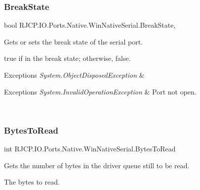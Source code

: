 \subsubsection{\texorpdfstring{BreakState}{BreakState}}
{\footnotesize\ttfamily bool R\+J\+C\+P.\+I\+O.\+Ports.\+Native.\+Win\+Native\+Serial.\+Break\+State\hspace{0.3cm}{\ttfamily [get]}, {\ttfamily [set]}}



Gets or sets the break state of the serial port. 

{\ttfamily true} if in the break state; otherwise, {\ttfamily false}. 


\begin{DoxyExceptions}{Exceptions}
{\em System.\+Object\+Disposed\+Exception} & 
\begin{DoxyExceptions}{Exceptions}
{\em System.\+Invalid\+Operation\+Exception} & Port not open.\\
\hline
\end{DoxyExceptions}
\\
\hline
\end{DoxyExceptions}
\mbox{\label{class_r_j_c_p_1_1_i_o_1_1_ports_1_1_native_1_1_win_native_serial_ab4ff2e42c520b5d86773f996bf1af716}} 
\subsubsection{\texorpdfstring{BytesToRead}{BytesToRead}}
{\footnotesize\ttfamily int R\+J\+C\+P.\+I\+O.\+Ports.\+Native.\+Win\+Native\+Serial.\+Bytes\+To\+Read\hspace{0.3cm}{\ttfamily [get]}}



Gets the number of bytes in the driver queue still to be read. 

The bytes to read. \mbox{\label{class_r_j_c_p_1_1_i_o_1_1_ports_1_1_native_1_1_win_native_serial_a7575be31e3a48e5c5900dfc0a75e8349}} 
